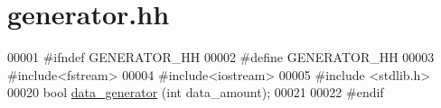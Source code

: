 \hypertarget{generator_8hh_source}{}\section{generator.\+hh}
\label{generator_8hh_source}

\begin{DoxyCode}
00001 \textcolor{preprocessor}{#ifndef GENERATOR\_HH}
00002 \textcolor{preprocessor}{#define GENERATOR\_HH }
00003 \textcolor{preprocessor}{#include<fstream>}
00004 \textcolor{preprocessor}{#include<iostream>}
00005 \textcolor{preprocessor}{#include <stdlib.h>}
00020 \textcolor{keywordtype}{bool} \hyperlink{generator_8hh_a6c501967035e575874570ef71d23f3af}{data\_generator} (\textcolor{keywordtype}{int} data\_amount);
00021   
00022 \textcolor{preprocessor}{#endif}
\end{DoxyCode}
